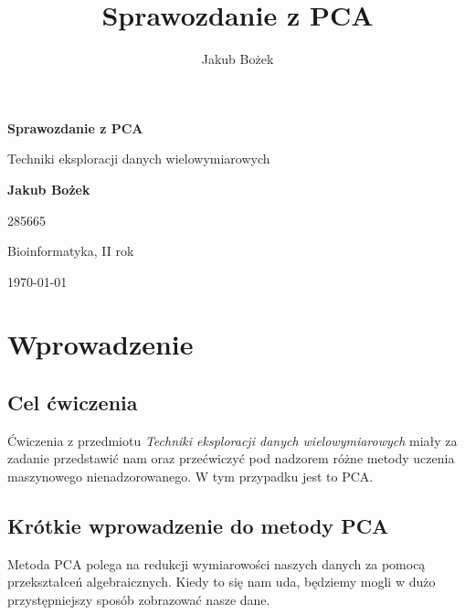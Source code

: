 \documentclass[12pt, a4paper]{article}
\author{Jakub Bożek}
\title{Sprawozdanie z PCA}
\begin{document}
\begin{titlepage}
    \centering
    {\LARGE \bfseries Sprawozdanie z PCA \par}
    \vspace{1cm}
    
    {\Large Techniki eksploracji danych wielowymiarowych \par}
    \vspace{2cm}
    
    {\LARGE \bfseries Jakub Bożek \par}
    \vspace{0.5cm}
    
    {\large 285665 \par}
    \vspace{0.5cm}
    
    {\large Bioinformatyka, II rok \par}
    \vspace{2cm}
    
    {\Large \today \par}
    
    \newpage
    \thispagestyle{empty}

    \tableofcontents
\end{titlepage}

\section{Wprowadzenie}

    \subsection{Cel ćwiczenia}

        Ćwiczenia z przedmiotu \textit{Techniki eksploracji danych wielowymiarowych} miały za zadanie przedstawić nam oraz przećwiczyć
        pod nadzorem różne metody uczenia maszynowego nienadzorowanego. W tym przypadku jest to PCA.

    \subsection{Krótkie wprowadzenie do metody PCA}
        Metoda PCA polega na redukcji wymiarowości naszych danych za pomocą przekształceń algebraicznych.
        Kiedy to się nam uda, będziemy mogli w dużo przystępniejszy sposób zobrazować nasze dane.
\end{document}
